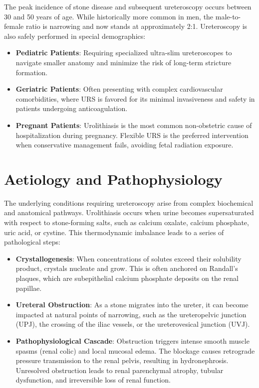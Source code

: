 The peak incidence of stone disease and subsequent ureteroscopy occurs between 30 and 50 years of age. While historically more common in men, the male-to-female ratio is narrowing and now stands at approximately 2:1. Ureteroscopy is also safely performed in special demographics:
\begin{itemize}
\item \textbf{Pediatric Patients}: Requiring specialized ultra-slim ureteroscopes to navigate smaller anatomy and minimize the risk of long-term stricture formation.
\item \textbf{Geriatric Patients}: Often presenting with complex cardiovascular comorbidities, where URS is favored for its minimal invasiveness and safety in patients undergoing anticoagulation.
\item \textbf{Pregnant Patients}: Urolithiasis is the most common non-obstetric cause of hospitalization during pregnancy. Flexible URS is the preferred intervention when conservative management fails, avoiding fetal radiation exposure.
\end{itemize}

\section*{Aetiology and Pathophysiology}
The underlying conditions requiring ureteroscopy arise from complex biochemical and anatomical pathways. Urolithiasis occurs when urine becomes supersaturated with respect to stone-forming salts, such as calcium oxalate, calcium phosphate, uric acid, or cystine. This thermodynamic imbalance leads to a series of pathological steps:
\begin{itemize}
\item \textbf{Crystallogenesis}: When concentrations of solutes exceed their solubility product, crystals nucleate and grow. This is often anchored on Randall's plaques, which are subepithelial calcium phosphate deposits on the renal papillae.
\item \textbf{Ureteral Obstruction}: As a stone migrates into the ureter, it can become impacted at natural points of narrowing, such as the ureteropelvic junction (UPJ), the crossing of the iliac vessels, or the ureterovesical junction (UVJ).
\item \textbf{Pathophysiological Cascade}: Obstruction triggers intense smooth muscle spasms (renal colic) and local mucosal edema. The blockage causes retrograde pressure transmission to the renal pelvis, resulting in hydronephrosis. Unresolved obstruction leads to renal parenchymal atrophy, tubular dysfunction, and irreversible loss of renal function.
\end{itemize}


